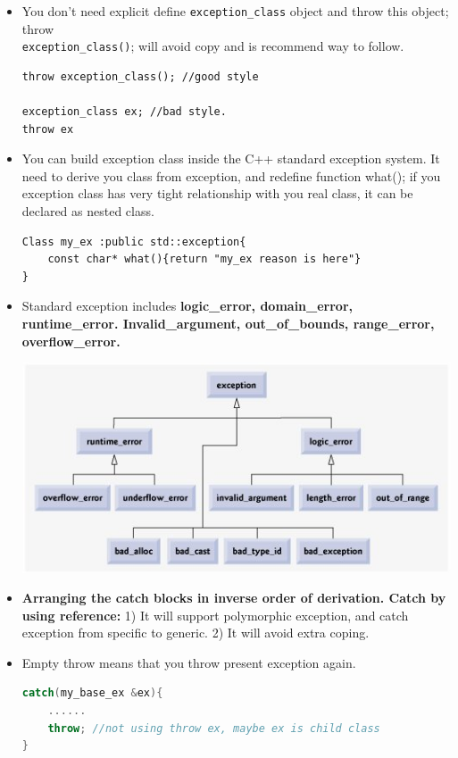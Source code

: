 \documentclass[a4paper,11pt,twoside]{book}
\begin{document}
\begin{itemize}
	\item You don't need explicit define \texttt{exception\_class} object and throw this object; throw \\ \texttt{exception\_class()}; will avoid copy and is recommend way to follow.
\begin{lstlisting}[numbers=none]
throw exception_class(); //good style

exception_class ex; //bad style.
throw ex
\end{lstlisting}
	
	
	\item You can build exception class inside the C++ standard exception system. It need to derive you class from exception, and redefine function what();  if you exception class has very tight relationship with you real class, it can be declared as nested class.
	
\begin{lstlisting}[numbers=none]
Class my_ex :public std::exception{
	const char* what(){return "my_ex reason is here"}
}
\end{lstlisting}
	
	
	\item Standard exception includes \textbf{logic\_error, domain\_error,  runtime\_error.  Invalid\_argument, out\_of\_bounds, range\_error, overflow\_error.}
	
	\begin{center}
			\includegraphics[scale=0.8]{pics/exception.jpg}
	\end{center}

	\item \textbf{Arranging the catch blocks in inverse order of derivation. Catch by using reference:} 1) It will support polymorphic exception, and catch exception from specific to generic. 2) It will avoid extra coping.

	
	\item Empty throw means that you throw present exception again.
\begin{lstlisting}[frame=single, language=c++]
catch(my_base_ex &ex){
	......
	throw; //not using throw ex, maybe ex is child class
}
\end{lstlisting}


\end{itemize}
\end{document}

